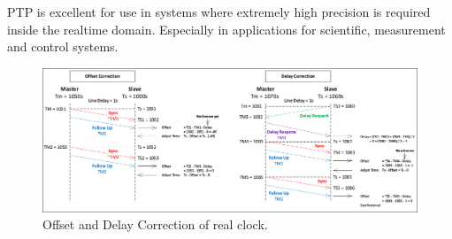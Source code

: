 PTP is excellent for use in systems where extremely high precision is required  inside the realtime domain. Especially in applications for scientific, measurement and control systems.

\begin{figure}[H]
	\centering
	\includegraphics[width=\linewidth]{synchronization/realClock/fig/offsetAndDelayCorrection.pdf}
	\caption{Offset and Delay Correction of real clock.}
	\label{fig:offsetAndDelayCorrection}
\end{figure}